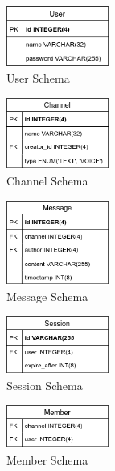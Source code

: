 \begin{figure}[h!]
    \caption{User Schema}
    \label{image:userSchema}
    \centering
    \includegraphics[width=0.3\textwidth]{images/UserSchema.png}
\end{figure}

\begin{figure}[h!]
    \caption{Channel Schema}
    \label{image:channelSchema}
    \centering
    \includegraphics[width=0.3\textwidth]{images/ChannelSchema.png}
\end{figure}

\begin{figure}[h!]
    \caption{Message Schema}
    \label{image:messageSchema}
    \centering
    \includegraphics[width=0.3\textwidth]{images/MessageSchema.png}
\end{figure}

\begin{figure}[h!]
    \caption{Session Schema}
    \label{image:sessionSchema}
    \centering
    \includegraphics[width=0.3\textwidth]{images/SessionSchema.png}
\end{figure}

\begin{figure}[h!]
    \caption{Member Schema}
    \label{image:memberSchema}
    \centering
    \includegraphics[width=0.3\textwidth]{images/MemberSchema.png}
\end{figure}

